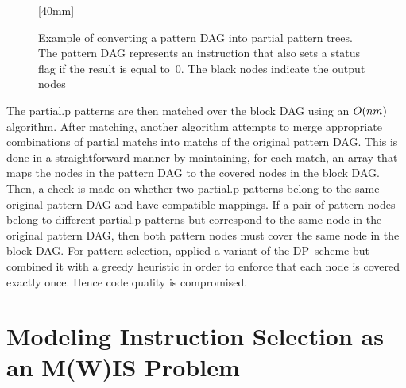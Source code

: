 \begin{figure}
  \mbox{}%
  \hfill%
                [40mm]%
                {%
                }%
  \hfill%
                {%
                  \hspace{1.5em}%
                }%
  \hfill%
  \mbox{}

  \caption[Example of converting a pattern DAG into partial tree patterns]%
          {%
            Example of converting a pattern DAG into partial pattern trees.
            The pattern DAG represents an  instruction that also
            sets a status flag if the result is equal to~\num{0}.
            The black nodes indicate the output nodes%
          }
\end{figure}

The \gls{partial.p} \glspl{pattern} are then matched over the \gls{block DAG}
using an \mbox{$O(nm)$} algorithm.
%
After matching, another algorithm attempts to merge appropriate combinations of
partial \glspl{match} into \glspl{match} of the original \gls{pattern DAG}.
%
This is done in a straightforward manner by maintaining, for each \gls{match},
an array that maps the \glspl{node} in the \gls{pattern DAG} to the covered
\glspl{node} in the \gls{block DAG}.
%
Then, a check is made on whether two \gls{partial.p} \glspl{pattern} belong to
the same original \gls{pattern DAG} and have compatible mappings.
%
If a pair of \gls{pattern} \glspl{node} belong to different \gls{partial.p}
\glspl{pattern} but correspond to the same \gls{node} in the original
\gls{pattern DAG}, then both \gls{pattern} \glspl{node} must cover the same
\gls{node} in the \gls{block DAG}.
%
For \gls{pattern selection}, \citeauthor{ArnoldCorporaal:1999} applied a variant
of the \gls{DP}~scheme but combined it with a greedy heuristic in order to
enforce that each \gls{node} is covered exactly once.
%
Hence code quality is compromised.


\section{Modeling Instruction Selection as an M(W)IS Problem}

